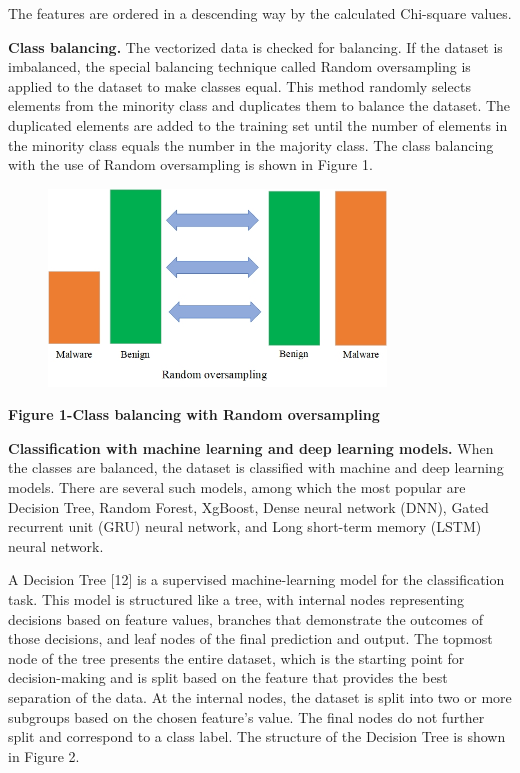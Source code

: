 The features are ordered in a descending way by the calculated
Chi-square values.

{\bfseries Class balancing.} The vectorized data is checked for balancing.
If the dataset is imbalanced, the special balancing technique called
Random oversampling is applied to the dataset to make classes equal.
This method randomly selects elements from the minority class and
duplicates them to balance the dataset. The duplicated elements are
added to the training set until the number of elements in the minority
class equals the number in the majority class. The class balancing with
the use of Random oversampling is shown in Figure 1.

\begin{figure}[H]
	\centering
	\includegraphics[width=0.8\textwidth]{media/ict/image38}
	\caption*{}
\end{figure}


{\bfseries Figure 1-Class balancing with Random oversampling}

{\bfseries Classification with machine learning and deep learning models.}
When the classes are balanced, the dataset is classified with machine
and deep learning models. There are several such models, among which the
most popular are Decision Tree, Random Forest, XgBoost, Dense neural
network (DNN), Gated recurrent unit (GRU) neural network, and Long
short-term memory (LSTM) neural network.

A Decision Tree {[}12{]} is a supervised machine-learning model for the
classification task. This model is structured like a tree, with internal
nodes representing decisions based on feature values, branches that
demonstrate the outcomes of those decisions, and leaf nodes of the final
prediction and output. The topmost node of the tree presents the entire
dataset, which is the starting point for decision-making and is split
based on the feature that provides the best separation of the data. At
the internal nodes, the dataset is split into two or more subgroups
based on the chosen feature's value. The final nodes do not further
split and correspond to a class label. The structure of the Decision
Tree is shown in Figure 2.

